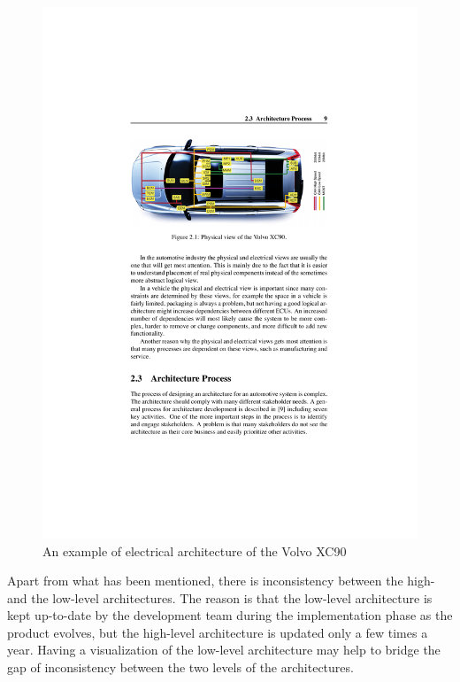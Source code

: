 \begin{figure}[H]
\centering
\captionsetup{justification=centering}
\vspace{0cm}%
\includegraphics[width=0.9\linewidth]{figure/literatures/wallin_physical.pdf}
\caption{An example of electrical architecture of the Volvo XC90~\cite{Wallin}}
\end{figure}

Apart from what has been mentioned, there is inconsistency between the high- and the low-level architectures. The reason is that the low-level architecture is kept up-to-date by the development team during the implementation phase as the product evolves, but the high-level architecture is updated only a few times a year. Having a visualization of the low-level architecture may help to bridge the gap of inconsistency between the two levels of the architectures.


